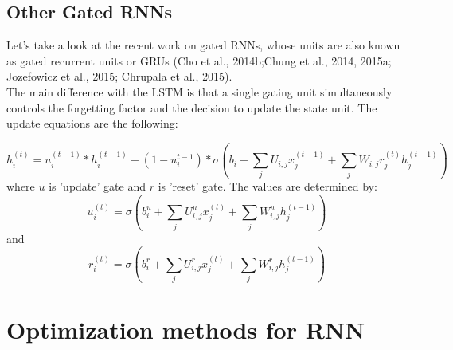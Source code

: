 \subsection{Other Gated RNNs}
Let's take a look at the recent work on gated RNNs, whose units are also known as gated recurrent units or GRUs (Cho et al., 2014b;Chung et al., 2014, 2015a; Jozefowicz et al., 2015; Chrupala et al., 2015). \\
The main difference with the LSTM is that a single gating unit simultaneously controls the forgetting factor and the decision to update the state unit. The update equations are the following:

\begin{equation}
h_i^{(t)} = u_i^{(t-1)} \ast h_i^{(t-1)} + (1 - u_i^{t-1}) \ast \sigma(b_i + \sum_jU_{i,j}x_j^{(t-1)} + \sum_jW_{i,j}r_j^{(t)}h_j^{(t-1)})
\end{equation}
where $u$ is 'update' gate and $r$ is 'reset' gate. The values are determined by:
\begin{equation}
u_i^{(t)} = \sigma(b_i^u + \sum_jU_{i,j}^ux_j^{(t)} + \sum_jW_{i,j}^uh_j^{(t-1)})
\end{equation}
and
\begin{equation}
r_i^{(t)} = \sigma(b_i^r + \sum_jU_{i,j}^rx_j^{(t)} + \sum_jW_{i,j}^rh_j^{(t-1)})
\end{equation}
\section{Optimization methods for RNN}
